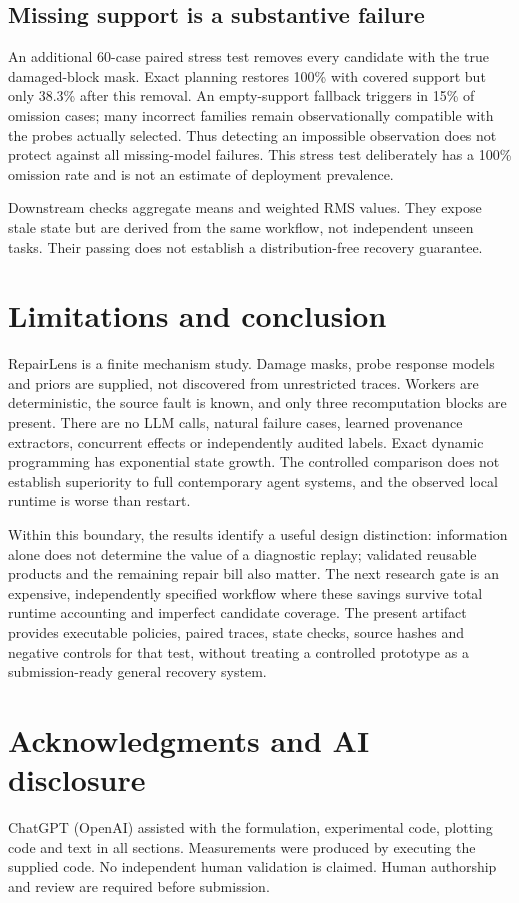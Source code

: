 \documentclass[10pt,letterpaper]{article}
\begin{document}
\subsection{Missing support is a substantive failure}
An additional 60-case paired stress test removes every candidate with the true damaged-block mask. Exact planning restores 100\% with covered support but only 38.3\% after this removal. An empty-support fallback triggers in 15\% of omission cases; many incorrect families remain observationally compatible with the probes actually selected. Thus detecting an impossible observation does not protect against all missing-model failures. This stress test deliberately has a 100\% omission rate and is not an estimate of deployment prevalence.

Downstream checks aggregate means and weighted RMS values. They expose stale state but are derived from the same workflow, not independent unseen tasks. Their passing does not establish a distribution-free recovery guarantee.

\section{Limitations and conclusion}
RepairLens is a finite mechanism study. Damage masks, probe response models and priors are supplied, not discovered from unrestricted traces. Workers are deterministic, the source fault is known, and only three recomputation blocks are present. There are no LLM calls, natural failure cases, learned provenance extractors, concurrent effects or independently audited labels. Exact dynamic programming has exponential state growth. The controlled comparison does not establish superiority to full contemporary agent systems, and the observed local runtime is worse than restart.

Within this boundary, the results identify a useful design distinction: information alone does not determine the value of a diagnostic replay; validated reusable products and the remaining repair bill also matter. The next research gate is an expensive, independently specified workflow where these savings survive total runtime accounting and imperfect candidate coverage. The present artifact provides executable policies, paired traces, state checks, source hashes and negative controls for that test, without treating a controlled prototype as a submission-ready general recovery system.

\section{Acknowledgments and AI disclosure}
ChatGPT (OpenAI) assisted with the formulation, experimental code, plotting code and text in all sections. Measurements were produced by executing the supplied code. No independent human validation is claimed. Human authorship and review are required before submission.
\end{document}
